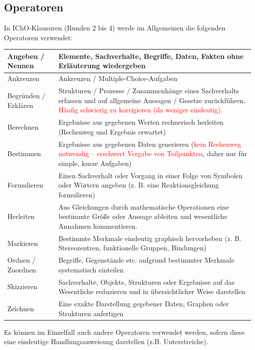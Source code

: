 \documentclass[../main.tex]{subfiles}
\begin{document}
\subsection{Operatoren}
In IChO-Klausuren (Runden 2 bis 4) werde im Allgemeinen die folgenden Operatoren verwendet:\\
\begin{tabular}{|C{2.2cm}|L{13.7cm}|}\hline
Angeben / Nennen & Elemente, Sachverhalte, Begriffe, Daten, Fakten ohne Erl\"auterung wiedergeben \\\hline
Ankreuzen & Ankreuzen / Multiple-Choice-Aufgaben \\\hline
Begr\"unden / Erkl\"aren & Strukturen / Prozesse / Zusammenh\"ange eines Sachverhalts erfassen und auf allgemeine Aussagen / Gesetze zur\"uckf\"uhren.\newline
\textcolor{red}{H\"aufig schwierig zu korrigieren (da weniger eindeutig).} \\\hline
Berechnen & Ergebnisse aus gegebenen Werten rechnerisch herleiten (Rechenweg und Ergebnis erwartet)\\\hline
Bestimmen & Ergebnisse aus gegebenen Daten generieren (\textcolor{red}{kein Rechenweg notwendig -- erschwert Vergabe von Teilpunkten}, daher nur f\"ur simple, kurze Aufgaben)\\\hline
Formulieren & Einen Sachverhalt oder Vorgang in einer Folge von Symbolen oder W\"ortern angeben (z. B. eine Reaktionsgleichung formulieren) \\\hline
Herleiten & Aus Gleichungen durch mathematische Operationen eine bestimmte Gr\"o\ss{}e oder Aussage ableiten und wesentliche Annahmen kommentieren. \\\hline
Markieren & Bestimmte Merkmale eindeutig graphisch hervorheben
(z. B. Stereozentren, funktionelle Gruppen, Bindungen) \\\hline
Ordnen / Zuordnen & Begriffe, Gegenst\"ande etc. aufgrund bestimmter Merkmale systematisch einteilen \\\hline
Skizzieren & Sachverhalte, Objekte, Strukturen oder Ergebnisse auf das Wesentliche reduzieren und in \"ubersichtlicher Weise darstellen \\\hline
Zeichnen & Eine exakte Darstellung gegebener Daten, Graphen oder Strukturen anfertigen \\\hline
\end{tabular}

Es k\"onnen im Einzelfall auch andere Operatoren verwendet werden, sofern diese eine eindeutige Handlungsanweisung darstellen (z.B. Unterstreiche). 
\end{document}
